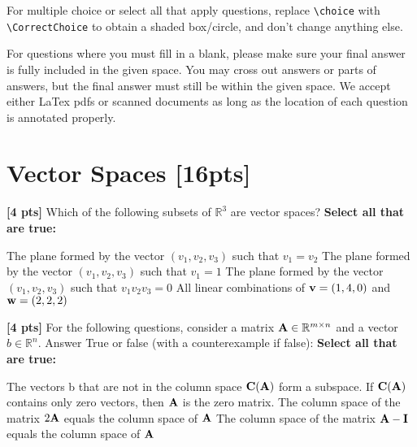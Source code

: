 \documentclass[11pt,addpoints,answers]{exam}
\numberwithin{equation}{section} %
\numberwithin{figure}{section} %
\numberwithin{table}{section} %
\begin{document}
For multiple choice or select all that apply questions, replace \lstinline{\choice} with \lstinline{\CorrectChoice} to obtain a shaded box/circle, and don't change anything else.


For questions where you must fill in a blank, please make sure your final answer is fully included in the given space. You may cross out answers or parts of answers, but the final answer must still be within the given space. We accept either LaTex pdfs or scanned documents as long as the location of each question is annotated properly.


\clearpage

\section{Vector Spaces  [16pts]}
\begin{questions}

\question \textbf{[4 pts]} Which of the following subsets of $\mathbb{R}^3$ are vector spaces?
    \textbf{Select all that are true:} 
    \checkboxchar{$\Box$} \checkedchar{$\blacksquare$}
    \begin{checkboxes}
        \choice The plane formed by the vector $(v_1, v_2, v_3) $ such that $v_1 = v_2$
        \choice The plane formed by the vector $(v_1, v_2, v_3) $ such that $v_1 = 1$
        \choice The plane formed by the vector $(v_1, v_2, v_3) $  such that $v_1 v_2 v_3 = 0$
        \choice All linear combinations of $\mathbf{v} = (1, 4, 0)$ and $\mathbf{w} = (2, 2, 2)$
    \end{checkboxes}

\question \textbf{[4 pts]} For the following questions, consider a matrix $\mathbf{A} \in \mathbb{R}^{m \times n}$ and a vector $b \in \mathbb{R}^n$. Answer True or false (with a counterexample if false):
    \textbf{Select all that are true:} 
    \begin{checkboxes}
        \choice The vectors b that are not in the column space $\mathbf{C}(\mathbf{A})$ form a subspace.
        \choice If $\mathbf{C}(\mathbf{A})$ contains only zero vectors, then $\mathbf{A}$ is the zero matrix.
        \choice The column space of the matrix $2\mathbf{A}$ equals the column space of $\mathbf{A}$
        \choice The column space of the matrix $\mathbf{A} - \mathbf{I}$ equals the column space of $\mathbf{A}$
    \end{checkboxes}
    \begin{tcolorbox}[fit,height=3cm, width=\textwidth, blank, borderline={0.5pt}{-2pt},halign=center, valign=center, nobeforeafter]
    \end{tcolorbox}


\end{questions}
\end{document}
